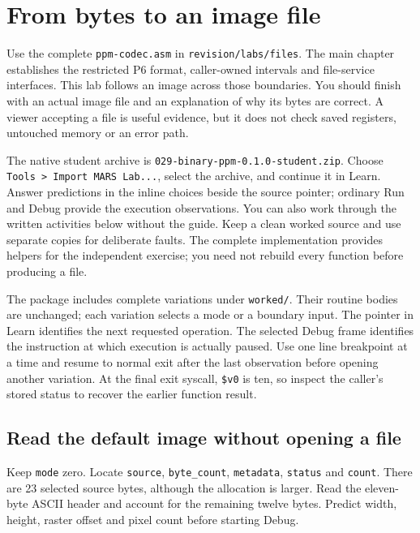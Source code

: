 \chapter{From bytes to an image file}
\label{revision-lab:files}

Use the complete \texttt{ppm-codec.asm} in \texttt{revision/labs/files}.
The main chapter establishes the restricted P6 format, caller-owned intervals
and file-service interfaces. This lab follows an image across those boundaries.
You should finish with an actual image file and an explanation of why its bytes
are correct. A viewer accepting a file is useful evidence, but it does not check
saved registers, untouched memory or an error path.

The native student archive is \texttt{029-binary-ppm-0.1.0-student.zip}.
Choose \texttt{Tools > Import MARS Lab...}, select the archive, and continue it
in Learn. Answer predictions in the inline choices beside the source pointer;
ordinary Run and Debug provide the execution observations. You can also work
through the written activities below without the guide. Keep a clean worked
source and use separate copies for deliberate faults. The complete implementation
provides helpers for the independent exercise; you need not rebuild every
function before producing a file.

The package includes complete variations under \texttt{worked/}. Their routine
bodies are unchanged; each variation selects a mode or a boundary input. The
pointer in Learn identifies the next requested operation. The selected Debug
frame identifies the instruction at which execution is actually paused. Use
one line breakpoint at a time and resume to normal exit after the last
observation before opening another variation. At the final exit syscall,
\texttt{\$v0} is ten, so inspect the caller's stored status to recover the
earlier function result.

\section{Read the default image without opening a file}

Keep \texttt{mode} zero. Locate \texttt{source}, \texttt{byte\_count},
\texttt{metadata}, \texttt{status} and \texttt{count}. There are 23 selected
source bytes, although the allocation is larger. Read the eleven-byte ASCII
header and account for the remaining twelve bytes. Predict width, height,
raster offset and pixel count before starting Debug.

